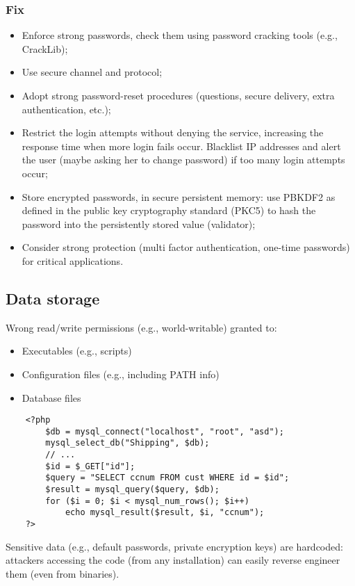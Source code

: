 \documentclass[a4paper, 10pt, titlepage]{article}
\begin{document}
\subsubsection*{Fix}
\begin{itemize}
\item Enforce strong passwords, check them using password cracking tools (e.g., CrackLib);
\item Use secure channel and protocol;
\item Adopt strong password-reset procedures (questions, secure delivery, extra authentication, etc.);
\item Restrict the login attempts without denying the service, increasing the response time when more login fails occur. Blacklist IP addresses and alert the user (maybe asking her to change password) if too many login attempts occur;
\item Store encrypted passwords, in secure persistent memory: use PBKDF2 as defined in the public key cryptography standard (PKC5)
to hash the password into the persistently stored value (validator);
\item Consider strong protection (multi factor authentication, one-time passwords) for critical applications.
\end{itemize}

\subsection{Data storage}
Wrong read/write permissions (e.g., world-writable) granted
to:
\begin{itemize}
\item Executables (e.g., scripts)
\item Configuration files (e.g., including PATH info)
\item Database files
\end{itemize}
\begin{lstlisting}
	<?php
		$db = mysql_connect("localhost", "root", "asd");
		mysql_select_db("Shipping", $db);
		// ...
		$id = $_GET["id"];
		$query = "SELECT ccnum FROM cust WHERE id = $id";
		$result = mysql_query($query, $db);
		for ($i = 0; $i < mysql_num_rows(); $i++)
			echo mysql_result($result, $i, "ccnum");
	?>
\end{lstlisting}
Sensitive data (e.g., default passwords, private encryption keys) are hardcoded: attackers accessing the code (from any installation) can easily reverse engineer them (even from binaries).
\end{document}
